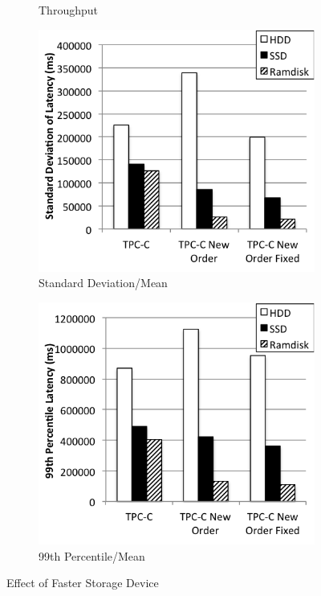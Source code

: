 \begin{figure}
\begin{subfigure}[t]{0.24\textwidth}
        \caption{Throughput}
        \label{fig:storage-throughput}
    \end{subfigure}
    \begin{subfigure}[t]{0.24\textwidth}
        \includegraphics[width=\textwidth]{plots/storage/std}
        \caption{Standard Deviation/Mean}
        \label{fig:storage-std-mean}
    \end{subfigure}
    \begin{subfigure}[t]{0.24\textwidth}
        \includegraphics[width=\textwidth]{plots/storage/99}
        \caption{99th Percentile/Mean}
        \label{fig:storage-99-mean}
    \end{subfigure}
\caption{Effect of Faster Storage Device}
\label{fig:storage}
\end{figure}

